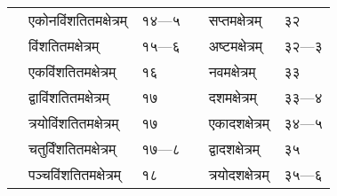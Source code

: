 \documentclass[11pt, openany]{book}
\makeatletter
\newcommand{\devanagarinumeral}[1]{%
	\devanagaridigits{\number \csname c@#1\endcsname}} %
\makeatother
\begin{document}
\begin{center}
\begin{tabular}{p{1.5in} l | p{1.5in} l}
~~एकोनविंशतितमक्षेत्रम् & १४---५ & ~~सप्तमक्षेत्रम् & ३२\\
~~विंशतितमक्षेत्रम् & १५---६ & ~~अष्टमक्षेत्रम् & ३२---३\\
~~एकविंशतितमक्षेत्रम् & १६ & ~~नवमक्षेत्रम् & ३३\\
~~द्वाविंशतितमक्षेत्रम् & १७ & ~~दशमक्षेत्रम् & ३३---४\\
~~त्रयोविंशतितमक्षेत्रम् & १७ & ~~एकादशक्षेत्रम् & ३४---५\\
~~चतुर्विंशतितमक्षेत्रम् & १७---८ & ~~द्वादशक्षेत्रम् & ३५\\
~~पञ्चविंशतितमक्षेत्रम् & १८ & ~~त्रयोदशक्षेत्रम् & ३५---६\\
\end{tabular}
\end{center}
\thispagestyle{empty}
\afterpage{\fancyhead[CE,CO]{\thepage}}
\cfoot{}
\newpage
\renewcommand{\thepage}{\devanagarinumeral{page}}
\setcounter{page}{2}
\end{document}
